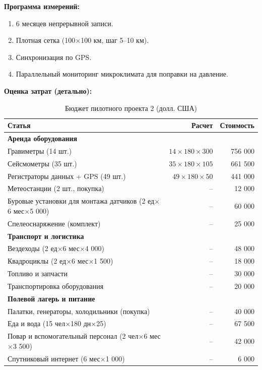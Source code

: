 \documentclass[12pt,a4paper]{article}
\theoremstyle{remark}
\begin{document}
	\textbf{Программа измерений:}
	\begin{enumerate}
		\item 6 месяцев непрерывной записи.
		\item Плотная сетка (100×100 км, шаг 5–10 км).
		\item Синхронизация по GPS.
		\item Параллельный мониторинг микроклимата для поправки на давление.
	\end{enumerate}
	
	\textbf{Оценка затрат (детально):}
	\begin{table}[htbp]
		\centering
		\caption{Бюджет пилотного проекта 2 (долл. США)}
		\label{tab:budget-karst}
		\small
		\begin{tabular}{lrr}
			\toprule
			\textbf{Статья} & \textbf{Расчет} & \textbf{Стоимость} \\
			\midrule
			\multicolumn{3}{l}{\textbf{Аренда оборудования}} \\
			Гравиметры (14 шт.) & $14\times180\times300$ & 756 000 \\
			Сейсмометры (35 шт.) & $35\times180\times105$ & 661 500 \\
			Регистраторы данных + GPS (49 шт.) & $49\times180\times50$ & 441 000 \\
			Метеостанции (2 шт., покупка) & – & 12 000 \\
			Буровые установки для монтажа датчиков (2 ед$\times$6 мес$\times$5 000) & – & 60 000 \\
			Спелеоснаряжение (комплект) & – & 25 000 \\
			\multicolumn{3}{l}{\textbf{Транспорт и логистика}} \\
			Вездеходы (2 ед$\times$6 мес$\times$4 000) & – & 48 000 \\
			Квадроциклы (2 ед$\times$6 мес$\times$1 500) & – & 18 000 \\
			Топливо и запчасти & – & 30 000 \\
			Транспортировка оборудования & – & 20 000 \\
			\multicolumn{3}{l}{\textbf{Полевой лагерь и питание}} \\
			Палатки, генераторы, холодильники (покупка) & – & 40 000 \\
			Еда и вода (15 чел$\times$180 дн$\times$25) & – & 67 500 \\
			Повар и вспомогательный персонал (2 чел$\times$6 мес$\times$3 500) & – & 42 000 \\
			Спутниковый интернет (6 мес$\times$1 000) & – & 6 000 \\

\end{tabular}
\end{table}
\end{document}
